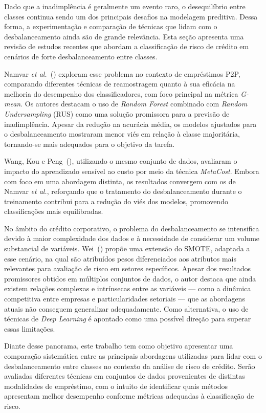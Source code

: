 Dado que a inadimplência é geralmente um evento raro, o desequilíbrio entre classes continua sendo um dos principais desafios na modelagem preditiva. Dessa forma, a experimentação e comparação de técnicas que lidam com o desbalanceamento ainda são de grande relevância. Esta seção apresenta uma revisão de estudos recentes que abordam a classificação de risco de crédito em cenários de forte desbalanceamento entre classes.

Namvar \textit{et al.}~(\citeyear{Namvar2018}) exploram esse problema no contexto de empréstimos P2P, comparando diferentes técnicas de reamostragem quanto à sua eficácia na melhoria do desempenho dos classificadores, com foco principal na métrica \textit{G-mean}. Os autores destacam o uso de \textit{Random Forest} combinado com \textit{Random Undersampling} (RUS) como uma solução promissora para a previsão de inadimplência. Apesar da redução na acurácia média, os modelos ajustados para o desbalanceamento mostraram menor viés em relação à classe majoritária, tornando-se mais adequados para o objetivo da tarefa.

Wang, Kou e Peng~(\citeyear{Namvar2018}), utilizando o mesmo conjunto de dados, avaliaram o impacto do aprendizado sensível ao custo por meio da técnica \textit{MetaCost}. Embora com foco em uma abordagem distinta, os resultados convergem com os de Namvar \textit{et al.}, reforçando que o tratamento do desbalanceamento durante o treinamento contribui para a redução do viés dos modelos, promovendo classificações mais equilibradas.

No âmbito do crédito corporativo, o problema do desbalanceamento se intensifica devido à maior complexidade dos dados e à necessidade de considerar um volume substancial de variáveis. Wei~(\citeyear{Wei2025}) propõe uma extensão do SMOTE, adaptada a esse cenário, na qual são atribuídos pesos diferenciados aos atributos mais relevantes para avaliação de risco em setores específicos. Apesar dos resultados promissores obtidos em múltiplos conjuntos de dados, o autor destaca que ainda existem relações complexas e intrínsecas entre as variáveis — como a dinâmica competitiva entre empresas e particularidades setoriais — que as abordagens atuais não conseguem generalizar adequadamente. Como alternativa, o uso de técnicas de \textit{Deep Learning} é apontado como uma possível direção para superar essas limitações.

Diante desse panorama, este trabalho tem como objetivo apresentar uma comparação sistemática entre as principais abordagens utilizadas para lidar com o desbalanceamento entre classes no contexto da análise de risco de crédito. Serão avaliadas diferentes técnicas em conjuntos de dados provenientes de distintas modalidades de empréstimo, com o intuito de identificar quais métodos apresentam melhor desempenho conforme métricas adequadas à classificação de risco.
